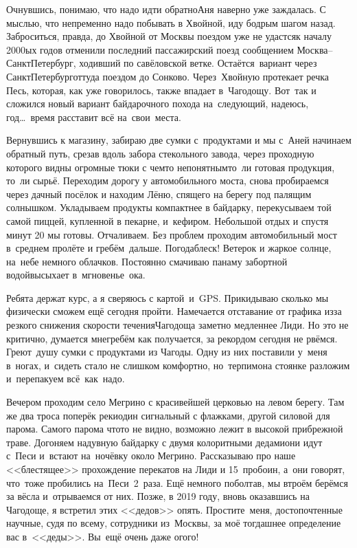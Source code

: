 Очнувшись, понимаю, что надо идти обратно\mdash Аня наверно уже заждалась. С мыслью, что непременно надо побывать в Хвойной, иду бодрым шагом назад. Заброситься, правда, до Хвойной от Москвы поездом уже не удастся\mdash к началу 2000\sdash ых годов отменили последний пассажирский поезд сообщением Москва\nobreakdash-- Санкт\sdash Петербург, ходивший по савёловской ветке. Остаётся~вариант через Санкт\sdash Петербург\mdash оттуда поездом до Сонково. Через~Хвойную протекает речка Песь, которая, как уже говорилось, также впадает в~Чагодощу. Вот~так и сложился новый вариант байдарочного похода на~следующий, надеюсь, год\ldots~время расставит всё на~свои~места.

Вернувшись к магазину, забираю две сумки с~продуктами и мы с~Аней начинаем обратный путь, срезав вдоль забора стекольного завода, через проходную которого видны огромные тюки с чем\sdash то непонятным\mdash то~ли готовая продукция, то~ли сырьё. Переходим дорогу у автомобильного моста, снова пробираемся через дачный посёлок и находим Лёню, спящего на берегу под палящим солнышком. Укладываем продукты компактнее в байдарку, перекусываем той самой пиццей, купленной в пекарне, и~кефиром. Небольшой отдых и спустя минут 20 мы готовы. Отчаливаем. Без проблем проходим автомобильный мост в~среднем пролёте и гребём~дальше. Погода\mdash блеск! Ветерок и жаркое солнце, на~небе немного облачков. Постоянно смачиваю панаму забортной водой\mdash высыхает в~мгновенье~ока. 

Ребята держат курс, а я сверяюсь с картой~и~GPS. Прикидываю сколько мы физически сможем ещё сегодня пройти. Намечается отставание от графика из\sdash за резкого снижения скорости течения\mdash Чагодоща заметно медленнее Лиди. Но это не критично, думается мне\mdash гребём как получается, за рекордом сегодня не рвёмся. Греют~душу сумки с продуктами из Чагоды. Одну из них поставили у~меня в~ногах, и~сидеть стало не слишком комфортно, но~терпимо\mdash на стоянке разложим и~перепакуем всё~как~надо. 

Вечером проходим село Мегрино с красивейшей церковью на левом берегу. Там же два троса поперёк реки\mdash один сигнальный с флажками, другой силовой для парома. Самого парома что\sdash то не видно, возможно лежит в высокой прибрежной траве. Догоняем надувную байдарку с двумя колоритными дедами\mdash они идут с~Песи и~встают на~ночёвку около Мегрино. Рассказываю про наше <<блестящее>> прохождение перекатов на Лиди и 15~пробоин, а~они говорят, что~тоже пробились на~Песи~2~раза. Ещё немного поболтав, мы втроём берёмся за вёсла и~отрываемся от них. Позже, в 2019 году, вновь оказавшись на Чагодоще, я встретил этих <<дедов>> опять. Простите~меня, достопочтенные научные, судя по всему, сотрудники из~Москвы, за моё тогдашнее определение вас в~<<деды>>. Вы~ещё очень даже ого\sdash го!

